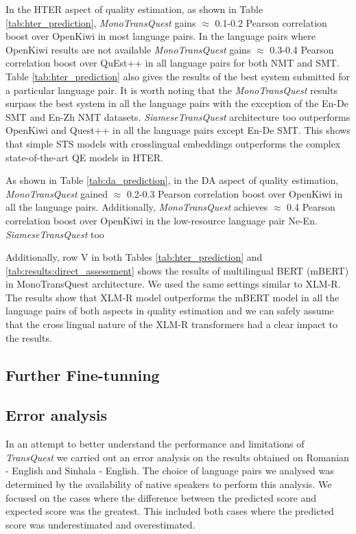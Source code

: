 In the HTER aspect of quality estimation, as shown in Table \ref{tab:hter_prediction}, \textit{MonoTransQuest} gains $\approx$ 0.1-0.2 Pearson correlation boost over OpenKiwi in most language pairs. In the language pairs where OpenKiwi results are not available \textit{MonoTransQuest} gains $\approx$ 0.3-0.4 Pearson correlation boost over QuEst++ in all language pairs for both NMT and SMT. Table \ref{tab:hter_prediction}  also gives the results of the best system submitted for a particular language pair. It is worth noting that the \textit{MonoTransQuest} results surpass the best system in all the language pairs with the exception of the En-De SMT and En-Zh NMT datasets. \textit{SiameseTransQuest} architecture too outperforms OpenKiwi and Quest++ in all the language pairs except En-De SMT. This shows that simple STS models with crosslingual embeddings outperforms the complex state-of-the-art QE models in HTER. 


As shown in Table \ref{tab:da_prediction}, in the DA aspect of quality estimation, \textit{MonoTransQuest}  gained $\approx$ 0.2-0.3 Pearson correlation boost over OpenKiwi in all the language pairs. Additionally, \textit{MonoTransQuest} achieves $\approx$ 0.4 Pearson correlation boost over OpenKiwi in the low-resource language pair Ne-En. \textit{SiameseTransQuest} too 

Additionally, row V in both Tables \ref{tab:hter_prediction} and \ref{tab:results:direct_assesement} shows the results of multilingual BERT (mBERT) in MonoTransQuest architecture. We used the same settings similar to XLM-R. The results show that XLM-R model outperforms the mBERT model in all the language pairs of both aspects in quality estimation and we can safely assume that the cross lingual nature of the XLM-R transformers had a clear impact to the results.

\subsection{Further Fine-tunning}
\label{sec:transquest_finetune}


\subsection{Error analysis}
\label{sebsec:error}

In an attempt to better understand the performance and limitations of \textit{TransQuest} we carried out an error analysis on the results obtained on Romanian - English and Sinhala - English. The choice of language pairs we analysed was determined by the availability of native speakers to perform this analysis. We focused on the cases where the difference between the predicted score and expected score was the greatest. This included both cases where the predicted score was underestimated and overestimated. 


